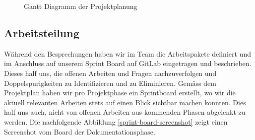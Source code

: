 \newpage
\thispagestyle{empty}
\recalctypearea
    \begin{figure}[H]
        \noindent
	    \begin{center}
		    \caption{Gantt Diagramm der Projektplanung}
            \label{gantt}
	    \end{center}
    \end{figure}
\newpage
\recalctypearea

\subsection{Arbeitsteilung}

Während den Besprechungen haben wir im Team die Arbeitspakete definiert und im Anschluss auf unserem
Sprint Board auf GitLab eingetragen und beschrieben. Dieses half uns, die offenen Arbeiten und Fragen
nachzuverfolgen und Doppelspurigkeiten zu Identifizieren und zu Eliminieren. Gemäss dem Projektplan haben wir
pro Projektphase ein Sprintboard erstellt, wo wir die aktuell relevanten Arbeiten stets auf einen Blick
sichtbar machen konnten. Dies half uns auch, nicht von offenen Arbeiten aus kommenden Phasen abgelenkt
zu werden. Die nachfolgende Abbildung \ref{sprint-board-screenshot} zeigt einen Screenshot vom Board der Dokumentationsphase.

